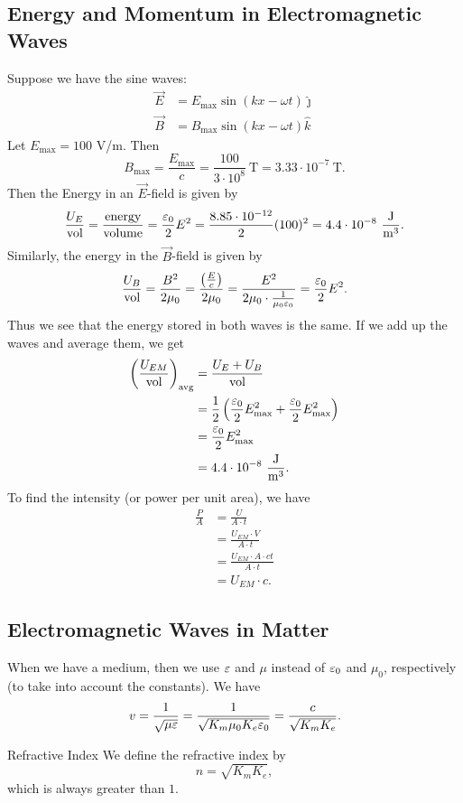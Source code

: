 \documentclass[class=article, crop=false]{standalone}
\begin{document}
  \subsection{Energy and Momentum in Electromagnetic Waves}
  Suppose we have the sine waves:
  \begin{align*}
    \vec{E} &= E_\text{max}\sin(kx - \omega t)\hat{\jmath} \\
    \vec{B} &= B_\text{max}\sin(kx - \omega t)\hat{k}
  \end{align*}
  Let $E_\text{max} = 100$ V/m. Then
  \[
    B_\text{max} = \frac{E_\text{max}}{c} = \frac{100}{3\cdot 10^8}\ \mathrm{T} = 3.33\cdot 10^{-7}\ \mathrm{T}.
  \]
  Then the Energy in an $\vec{E}$-field is given by
  \[
    \frac{U_E}{\text{vol}} = \frac{\text{energy}}{\text{volume}} = \frac{\eps_0}{2}E^2 = \frac{8.85\cdot 10^{-12}}{2}(100)^2 = 4.4\cdot 10^{-8}\ \frac{\mathrm{J}}{\mathrm{m}^3}.
  \]
  Similarly, the energy in the $\vec{B}$-field is given by
  \[
    \frac{U_B}{\text{vol}} = \frac{B^2}{2\mu_0} = \frac{\left( \frac{E}{c} \right)}{2\mu_0} = \frac{E^2}{2\mu_0\cdot \frac{1}{\mu_0\varepsilon_0}} = \frac{\varepsilon_0}{2}E^2.
  \]
  Thus we see that the energy stored in both waves is the same. If we add up the waves and average them, we get
  \begin{align*}
    \left( \frac{U_{EM}}{\text{vol}} \right)_\text{avg} &= \frac{U_E+U_B}{\text{vol}} \\
                                                 &= \frac{1}{2} \left( \frac{\varepsilon_0}{2}E_\text{max}^2 + \frac{\varepsilon_0}{2}E_\text{max}^2 \right) \\
                                                 &= \frac{\varepsilon_0}{2}E_\text{max}^2 \\
                                                 &= 4.4\cdot 10^{-8}\ \frac{\mathrm{J}}{\mathrm{m}^3}.
  \end{align*}
  To find the intensity (or power per unit area), we have
  \begin{align*}
    \frac{P}{A} &= \frac{U}{A\cdot t} \\
                &= \frac{U_{EM}\cdot V}{A\cdot t} \\
                &= \frac{U_{EM}\cdot A\cdot ct}{A\cdot t} \\
                &= U_{EM}\cdot c.
  \end{align*}
  \subsection{Electromagnetic Waves in Matter}
  When we have a medium, then we use $\varepsilon$ and $\mu$ instead of $\varepsilon_0$ and $\mu_0$, respectively (to take into account the constants). We have
  \[
    v = \frac{1}{\sqrt{\mu\varepsilon}} = \frac{1}{\sqrt{K_m\mu_0K_e\varepsilon_0}} = \frac{c}{\sqrt{K_mK_e}}.
  \]
  \begin{definition}{Refractive Index}
    We define the refractive index by
    \[
      n = \sqrt{K_mK_e},
    \]
    which is always greater than $1$.
  \end{definition}
\end{document}
